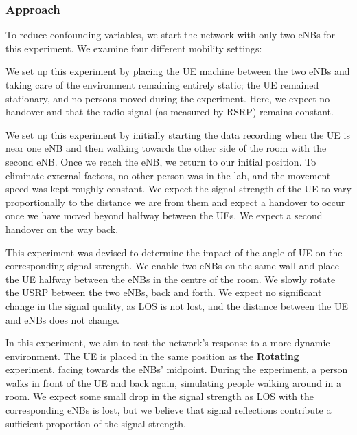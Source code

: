 \subsubsection{Approach}
To reduce confounding variables, we start the network with only two eNBs for this experiment. We examine four different mobility settings:
\begin{description}[style=unboxed]
    \item[\textbf{Stationary}] We set up this experiment by placing the UE machine between the two eNBs and taking care of the environment remaining entirely static; the UE remained stationary, and no persons moved during the experiment. Here, we expect no handover and that the radio signal (as measured by RSRP) remains constant.
    \item[\textbf{Walking}] We set up this experiment by initially starting the data recording when the UE is near one eNB and then walking towards the other side of the room with the second eNB. Once we reach the eNB, we return to our initial position. To eliminate external factors, no other person was in the lab, and the movement speed was kept roughly constant. We expect the signal strength of the UE to vary proportionally to the distance we are from them and expect a handover to occur once we have moved beyond halfway between the UEs. We expect a second handover on the way back.
    \item[\textbf{Rotating}] This experiment was devised to determine the impact of the angle of UE on the corresponding signal strength. We enable two eNBs on the same wall and place the UE halfway between the eNBs in the centre of the room. We slowly rotate the USRP between the two eNBs, back and forth. We expect no significant change in the signal quality, as LOS is not lost, and the distance between the UE and eNBs does not change.
    \item[\textbf{Dynamic Environment}] In this experiment, we aim to test the network's response to a more dynamic environment. The UE is placed in the same position as the \textbf{Rotating} experiment, facing towards the eNBs' midpoint. During the experiment, a person walks in front of the UE and back again, simulating people walking around in a room. We expect some small drop in the signal strength as LOS with the corresponding eNBs is lost, but we believe that signal reflections contribute a sufficient proportion of the signal strength.
\end{description}
